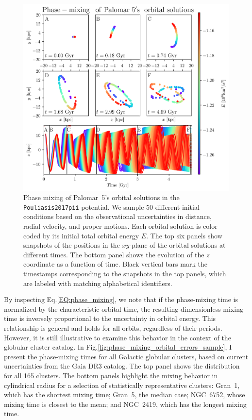            \begin{figure}
                \centering
                \includegraphics[width=\linewidth]{images/phase_mixing_palomar_5_orbital_solutions.png}
                \caption{Phase mixing of Palomar~5's orbital solutions in the \texttt{Pouliasis2017pii} potential. We sample 50 different initial conditions based on the observational uncertainties in distance, radial velocity, and proper motions. Each orbital solution is color-coded by its initial total orbital energy $E$. The top six panels show snapshots of the positions in the $xy$-plane of the orbital solutions at different times. The bottom panel shows the evolution of the $z$ coordinate as a function of time. Black vertical bars mark the timestamps corresponding to the snapshots in the top panels, which are labeled with matching alphabetical identifiers.}
                \label{fig:phase_mixing_palomar_5_orbital_solutions}
            \end{figure}    

            By inspecting Eq.\ref{EQ:phase_mixing}, we note that if the phase-mixing time is normalized by the characteristic orbital time, the resulting dimensionless mixing time is inversely proportional to the uncertainty in orbital energy. This relationship is general and holds for all orbits, regardless of their periods. However, it is still illustrative to examine this behavior in the context of the globular cluster catalog. In Fig.\ref{fig:phase_mixing_orbital_errors_sample}, I present the phase-mixing times for all Galactic globular clusters, based on current uncertainties from the Gaia DR3 catalog. The top panel shows the distribution for all 165 clusters. The bottom panels highlight the mixing behavior in cylindrical radius for a selection of statistically representative clusters: Gran~1, which has the shortest mixing time; Gran~5, the median case; NGC~6752, whose mixing time is closest to the mean; and NGC~2419, which has the longest mixing time.

